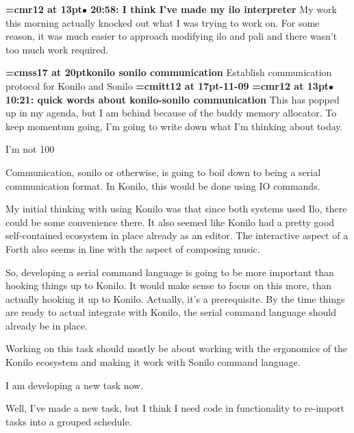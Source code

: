 {\smallskip\noindent\bf\font\titlefont=cmr12 at 13pt\titlefont $\bullet$ 20:58: I think I've made my ilo interpreter}\smallskip
My work this morning actually knocked out what I was trying to work on. For some reason, it was much easier to approach modifying ilo and pali and there wasn't too much work required.
\par

{\medskip\noindent\bf\font\titlefont=cmss17 at 20pt\titlefont konilo sonilo communication}\medskip
Establish communication protocol for Konilo and Sonilo
{\medskip\noindent\bf\font\titlefont=cmitt12 at 17pt-11-09}\medskip
{\smallskip\noindent\bf\font\titlefont=cmr12 at 13pt\titlefont $\bullet$ 10:21: quick words about konilo-sonilo communication}\smallskip
This has popped up in my agenda, but I am behind because of the buddy memory allocator. To keep momentum going, I'm going to write down what I'm thinking about today.
\par

I'm not 100%
\par

Communication, sonilo or otherwise, is going to boil down to being a serial communication format. In Konilo, this would be done using IO commands.
\par

My initial thinking with using Konilo was that since both systems used Ilo, there could be some convenience there. It also seemed like Konilo had a pretty good self-contained ecosystem in place already as an editor. The interactive aspect of a Forth also seems in line with the aspect of composing music.
\par

So, developing a serial command language is going to be more important than hooking things up to Konilo. It would make sense to focus on this more, than actually hooking it up to Konilo. Actually, it's a prerequisite. By the time things are ready to actual integrate with Konilo, the serial command language should already be in place.
\par

Working on this task should mostly be about working with the ergonomics of the Konilo ecosystem and making it work with Sonilo command language.
\par

I am developing a new task now.
\par

Well, I've made a new task, but I think I need code in functionality to re-import tasks into a grouped schedule.
\par

